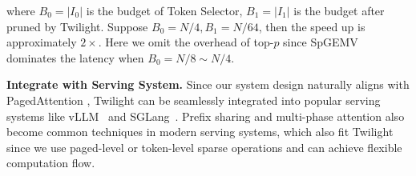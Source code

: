 where $B_0 = |I_0|$ is the budget of Token Selector, $B_1 = |I_1|$ is the budget after pruned by Twilight. Suppose $B_0 = N/4, B_1 = N/64$, then the speed up is approximately $2 \times$. Here we omit the overhead of top-$p$ since SpGEMV dominates the latency when $B_0 = N/8 \sim N/4$.



\textbf{Integrate with Serving System.} Since our system design naturally aligns with PagedAttention \cite{vllm}, Twilight can be 
seamlessly integrated into popular serving systems like vLLM~\cite{vllm} and SGLang~\cite{sglang}. Prefix sharing and multi-phase attention \cite{lin2024parrot, sglang, zhu2024relayattention, ye-etal-2024-chunkattention, cascade-inference} also become common techniques in modern serving systems, which also fit Twilight since we use paged-level or token-level sparse operations and can achieve flexible computation flow.